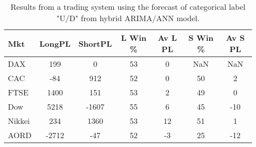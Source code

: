 \begin{table}[ht]
\centering
\caption[Results from a trading system using the forecast of categorical label "U/D" from hybrid ARIMA/ANN model]{Results from a trading system using the forecast of categorical label "U/D" from hybrid ARIMA/ANN model.} 
\label{tab:chp_ts:pUD_CAT_arima_ann_sys}
\begin{tabular}{lcccccc}
  \toprule Mkt & LongPL & ShortPL & L Win \% & Av L PL & S Win \% & Av S PL \\ 
  \midrule DAX & 199 & 0 & 53 & 0 & NaN & NaN \\ 
  CAC & -84 & 912 & 52 & 0 & 50 & 2 \\ 
  FTSE & 1400 & 151 & 53 & 2 & 49 & 0 \\ 
  Dow & 5218 & -1607 & 55 & 6 & 45 & -10 \\ 
  Nikkei & 234 & 1360 & 53 & 12 & 51 & 1 \\ 
  AORD & -2712 & -47 & 52 & -3 & 25 & -12 \\ 
   \bottomrule \end{tabular}
\end{table}
